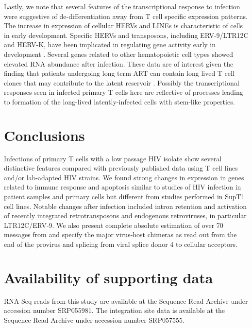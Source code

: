 \documentclass[../sherrill-Mix_thesis.tex]{subfiles}
\begin{document}
	Lastly, we note that several features of the transcriptional response to \hivEight{} infection were suggestive of de-differentiation away from T cell specific expression patterns. The increase in expression of cellular HERVs and LINEs is characteristic of cells in early development. Specific HERVs and transposons, including ERV-9/LTR12C and HERV-K, have been implicated in regulating gene activity early in development \citep{Ling2002,Pi2004,Santoni2012,Fuchs2013,Fort2014,Wang2014}. Several genes related to other hematopoietic cell types showed elevated RNA abundance after \hivEight{} infection. These data are of interest given the finding that patients undergoing long term ART can contain long lived T cell clones that may contribute to the latent reservoir \citep{Joos2008,Brennan2009,Wagner2013,Kearney2014,Cohn2015}.  Possibly the transcriptional responses seen in infected primary T cells here are reflective of processes leading to formation of the long-lived latently-infected cells with stem-like properties.

\section{Conclusions}
	Infections of primary T cells with a low passage HIV isolate show several distinctive features compared with previously published data using T cell lines and/or lab-adapted HIV strains. We found strong changes in expression in genes related to immune response and apoptosis similar to studies of HIV infection in patient samples and primary cells but different from studies performed in SupT1 cell lines. Notable changes after infection included intron retention and activation of recently integrated retrotransposons and endogenous retroviruses, in particular LTR12C/ERV-9. We also present complete absolute estimation of over 70 messages from \hivEight{} and specify the major virus-host chimeras as read out from the \threePrime{} end of the provirus and splicing from viral splice donor 4 to cellular acceptors.


\section{Availability of supporting data}
	RNA-Seq reads from this study are available at the Sequence Read Archive under accession number SRP055981. The integration site data is available at the Sequence Read Archive under accession number SRP057555.

\end{document}

